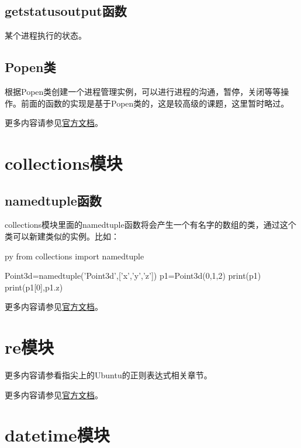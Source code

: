 \documentclass[12pt,oneside]{book}
\begin{document}
\begin{common-format}
\section{getstatusoutput函数}
某个进程执行的状态。



\section{Popen类}
根据Popen类创建一个进程管理实例，可以进行进程的沟通，暂停，关闭等等操作。前面的函数的实现是基于Popen类的，这是较高级的课题，这里暂时略过。


\begin{Large}
更多内容请参见\href{https://docs.python.org/3/library/subprocess.html}{官方文档}。
\end{Large}


\chapter{collections模块}
\section{namedtuple函数}
collections模块里面的namedtuple函数将会产生一个有名字的数组的类，通过这个类可以新建类似的实例。比如：
\begin{xverbatim}[129]{py}
from collections import namedtuple

Point3d=namedtuple('Point3d',['x','y','z'])
p1=Point3d(0,1,2)
print(p1)
print(p1[0],p1.z)
\end{xverbatim}

\begin{Large}
更多内容请参见\href{https://docs.python.org/3/library/collections.html}{官方文档}。
\end{Large}


\chapter{re模块}
\label{sec:re模块}
更多内容请参看指尖上的Ubuntu的正则表达式相关章节。

\begin{Large}
更多内容请参见\href{https://docs.python.org/3/library/re.html}{官方文档}。
\end{Large}


\chapter{datetime模块}


\end{common-format}
\end{document}
